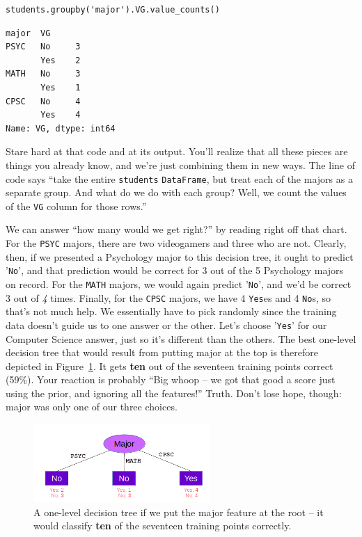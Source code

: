 \begin{Verbatim}[fontsize=\small,samepage=true,frame=single,framesep=3mm]
students.groupby('major').VG.value_counts()
\end{Verbatim}
\vspace{-.2in}

\begin{Verbatim}[fontsize=\small,samepage=true,frame=leftline,framesep=5mm,framerule=1mm]
major  VG 
PSYC   No     3
       Yes    2
MATH   No     3
       Yes    1
CPSC   No     4
       Yes    4
Name: VG, dtype: int64
\end{Verbatim}

Stare hard at that code and at its output. You'll realize that all these pieces
are things you already know, and we're just combining them in new ways. The
line of code says ``take the entire \texttt{students} \texttt{DataFrame}, but
treat each of the majors as a separate group. And what do we do with each
group? Well, we count the values of the \texttt{VG} column for those rows.''

We can answer ``how many would we get right?'' by reading right off that chart.
For the \texttt{PSYC} majors, there are two videogamers and three who are not.
Clearly, then, if we presented a Psychology major to this decision tree, it
ought to predict '\texttt{No}', and that prediction would be correct for 3 out
of the 5 Psychology majors on record. For the \texttt{MATH} majors, we would
again predict '\texttt{No}', and we'd be correct 3 out of \textit{4} times.
Finally, for the \texttt{CPSC} majors, we have 4 \texttt{Yes}es and 4
\texttt{No}s, so that's not much help. We essentially have to pick randomly
since the training data doesn't guide us to one answer or the other. Let's
choose '\texttt{Yes}' for our Computer Science answer, just so it's different
than the others. The best one-level decision tree that would result from
putting \textsf{major} at the top is therefore depicted in
Figure~\ref{fig:majorOnTop}. It gets \textbf{ten} out of the seventeen training
points correct (59\%). Your reaction is probably ``Big whoop -- we got that
good a score just using the prior, and ignoring all the features!'' Truth.
Don't lose hope, though: \textsf{major} was only one of our three choices.

\begin{figure}[ht]
\centering
\includegraphics[width=0.6\textwidth]{majorOnTop.png}
\caption{A one-level decision tree if we put the \textsf{major} feature at the
root -- it would classify \textbf{ten} of the seventeen training points
correctly.}
\label{fig:majorOnTop}
\end{figure}

